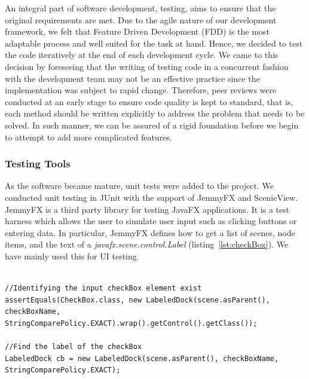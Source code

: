 An integral part of software development, testing, aims to ensure that the original requirements are met. Due to the agile nature of our development framework, we felt that Feature Driven Development (FDD) is the most adaptable process and well suited for the task at hand. Hence, we decided to test the code iteratively at the end of each development cycle. We came to this decision by foreseeing that the writing of testing code in a concurrent fashion with the development team may not be an effective practice since the implementation was subject to rapid change. Therefore, peer reviews were conducted at an early stage to ensure  code quality is kept to standard, that is, each method should be written explicitly to address the problem that needs to be solved. In such manner, we can be assured of a rigid foundation before we begin to attempt to add more complicated features.

\subsubsection*{Testing Tools}

As the software became mature, unit tests were added to the project. We conducted unit testing in JUnit with the support of JemmyFX and ScenicView. JemmyFX is a third party library for testing JavaFX applications. It is a test harness which allows the user to simulate user input such as clicking buttons or entering data. In particular, JemmyFX defines how to get a list of scenes, node items, and the text of a \textit{javafx.scene.control.Label} (listing~\ref{lst:checkBox}). We have mainly used this for UI testing. 


\begin{minipage}{0.9\textwidth}
	\begin{lstlisting}[caption={Use JemmyFX syntax to find a checkBox element}, label={lst:checkBox}]

//Identifying the input checkBox element exist
assertEquals(CheckBox.class, new LabeledDock(scene.asParent(), checkBoxName, StringComparePolicy.EXACT).wrap().getControl().getClass());

//Find the label of the checkBox 
LabeledDock cb = new LabeledDock(scene.asParent(), checkBoxName, StringComparePolicy.EXACT);

	\end{lstlisting}
\end{minipage}

